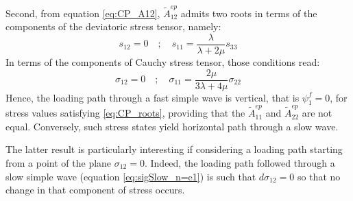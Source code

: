 Second, from equation \eqref{eq:CP_A12}, $\tilde{A}_{12}^{ep}$ admits two roots in terms of the components of the deviatoric stress tensor, namely: 
\begin{equation}
  s_{12}=0 \quad ; \quad s_{11}= \frac{\lambda}{\lambda+2\mu}s_{33}
\end{equation}
In terms of the components of Cauchy stress tensor, those conditions read:
\begin{equation}
  \label{eq:CP_roots}
  \sigma_{12}=0 \quad ; \quad \sigma_{11}=\frac{2\mu}{3\lambda+4\mu}\sigma_{22}
\end{equation}
Hence, the loading path through a fast simple wave is vertical, that is $\psi^f_1 = 0$, for stress values satisfying \eqref{eq:CP_roots}, providing that the $\tilde{A}_{11}^{ep}$ and $\tilde{A}_{22}^{ep}$ are not equal.
Conversely, such stress states yield horizontal path through a slow wave.
\begin{remark}
  \label{rq:loading_paths_CP1}
  The latter result is particularly interesting if considering a loading path starting from a point of the plane $\sigma_{12}=0$.
  Indeed, the loading path followed through a slow simple wave (equation \eqref{eq:sigSlow_n=e1}) is such that $d\sigma_{12}=0$ so that no change in that component of stress occurs.
\end{remark}


